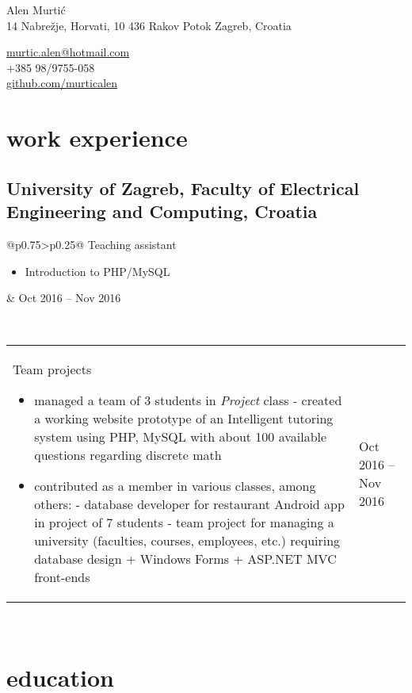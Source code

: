 \documentclass[a4paper]{article}
\makeatletter
\newlength{\tablewidth}
\newenvironment{period}[2]{%
\newcommand{\sarma}{#2}%
\setlength{\tablewidth}{\linewidth}
\addtolength{\tablewidth}{-2\tabcolsep}
\begin{tabular}{@{}p{0.75\tablewidth}>{\raggedleft\arraybackslash}p{0.25\tablewidth}@{}}%
#1 \newline
\begin{itemize}
}{%
\end{itemize} & \sarma \\%
\end{tabular}\\
}
\makeatother
\begin{document}
\fontfamily{\sfdefault}
\selectfont

\begin{minipage}{.5\textwidth}
\LARGE{Alen Murtić}\\
\normalsize{14 Nabrežje, Horvati, 10 436 Rakov Potok
	\newline
	Zagreb, Croatia}
\end{minipage}%
\begin{minipage}{.5\textwidth}
\raggedleft
\href{mailto:murtic.alen@hotmail.com}{murtic.alen@hotmail.com} \\
+385 98/9755-058 \\
\href{https://github.com/murticalen}{github.com/murticalen}
\end{minipage}

\vspace{1em}

\section{work experience}

\subsection{University of Zagreb, Faculty of Electrical Engineering and Computing, Croatia}
\begin{period}{Teaching assistant}{Oct 2016 -- Nov 2016}
	\item Introduction to PHP/MySQL
\end{period}
\begin{period}{Team projects}{}
	\item managed a team of 3 students in \textit{Project} class
	\newline
	- created a working website prototype of an Intelligent tutoring system using PHP, MySQL with about 100 available questions regarding discrete math
	\item contributed as a member in various classes, among others:
	\newline
	- database developer for restaurant Android app in project of 7 students
	\newline
	- team project for managing a university (faculties, courses, employees, etc.) requiring database design + Windows Forms + ASP.NET MVC front-ends
\end{period}

\section{education}
\end{document}
